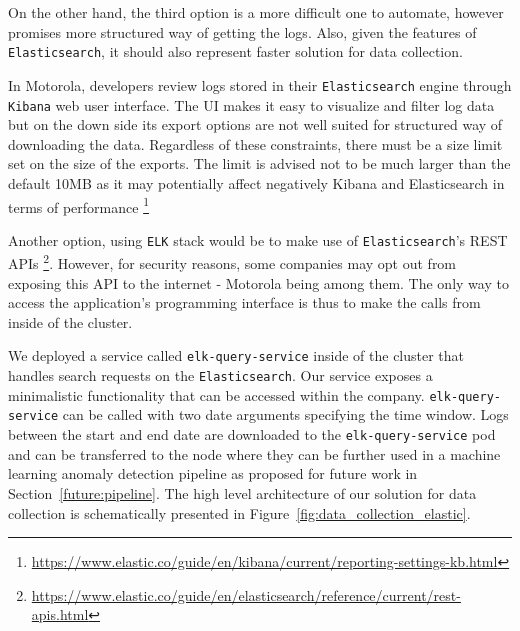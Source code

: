 On the other hand, the third option is a more difficult one to automate, however promises more structured way of getting the logs. Also, given the features of \texttt{Elasticsearch}, it should also represent faster solution for data collection.

In Motorola, developers review logs stored in their \texttt{Elasticsearch} engine through \texttt{Kibana} web user interface. The UI makes it easy to visualize and filter log data but on the down side its export options are not well suited for structured way of downloading the data. Regardless of these constraints, there must be a size limit set on the size of the exports. The limit is advised not to be much larger than the default 10MB as it may potentially affect negatively Kibana and Elasticsearch in terms of performance \footnote{\url{https://www.elastic.co/guide/en/kibana/current/reporting-settings-kb.html}}

Another option, using \texttt{ELK} stack would be to make use of \texttt{Elasticsearch}'s REST APIs \footnote{\url{https://www.elastic.co/guide/en/elasticsearch/reference/current/rest-apis.html}}. However, for security reasons, some companies may opt out from exposing this API to the internet - Motorola being among them.
The only way to access the application's programming interface is thus to make the calls from inside of the cluster.

We deployed a service called \texttt{elk-query-service} inside of the cluster that handles search requests on the \texttt{Elasticsearch}. Our service exposes a minimalistic functionality that can be accessed within the company.
\texttt{\justify elk-query-service} can be called with two date arguments specifying the time window. Logs between the start and end date are downloaded to the \texttt{elk-query-service} pod and can be transferred to the node where they can be further used in a machine learning anomaly detection pipeline as proposed for future work in Section~\ref{future:pipeline}. The high level architecture of our solution for data collection is schematically presented in Figure~\ref{fig:data_collection_elastic}.

\begin{figure}[!tbp] 
\end{figure}

